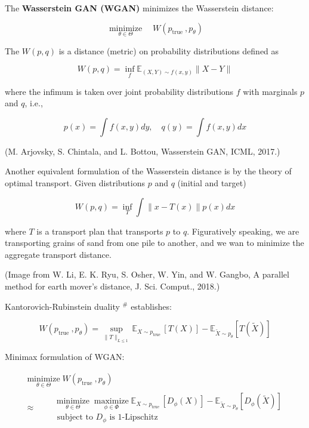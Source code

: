 \begin{definition}[21.29][WGAN]
    The \textbf{Wasserstein GAN (WGAN)} minimizes the Wasserstein distance:

    $$
    \underset{\theta \in \Theta}{\operatorname{minimize}} \quad W\left(p_{\text {true }}, p_{\theta}\right)
    $$

    The $W(p, q)$ is a distance (metric) on probability distributions defined as

    $$
    W(p, q)=\inf _{f} \mathbb{E}_{(X, Y) \sim f(x, y)}\|X-Y\|
    $$

    where the infimum is taken over joint probability distributions $f$ with marginals $p$ and $q$, i.e.,

    $$
    p(x)=\int f(x, y) d y, \quad q(y)=\int f(x, y) d x
    $$

    (M. Arjovsky, S. Chintala, and L. Bottou, Wasserstein GAN, ICML, 2017.)

    \par\noindent\textcolor{gray}{\hdashrule{\textwidth}{0.4pt}{1pt 2pt}}

    Another equivalent formulation of the Wasserstein distance is by the theory of optimal transport. Given distributions $p$ and $q$ (initial and target)

    $$
    W(p, q)=\inf _{T} \int\|x-T(x)\| p(x) d x
    $$

    where $T$ is a transport plan that transports $p$ to $q$.
    Figuratively speaking, we are transporting grains of sand from one pile to another, and we wan to minimize the aggregate transport distance.

    (Image from W. Li, E. K. Ryu, S. Osher, W. Yin, and W. Gangbo, A parallel method for earth mover’s distance, J. Sci. Comput., 2018.)

    \par\noindent\textcolor{gray}{\hdashrule{\textwidth}{0.4pt}{1pt 2pt}}

    Kantorovich-Rubinstein duality $^{\#}$ establishes:

    $$
    W\left(p_{\text {true }}, p_{\theta}\right)=\sup _{\|T\|_{L \leq 1}} \mathbb{E}_{X \sim p_{\text {true }}}[T(X)]-\mathbb{E}_{\tilde{X} \sim p_{\theta}}[T(\tilde{X})]
    $$

    Minimax formulation of WGAN:

    $$
    \begin{gathered}
    \underset{\theta \in \Theta}{\operatorname{minimize}} W\left(p_{\text {true }}, p_{\theta}\right) \\
    \approx \quad \begin{aligned}
    & \underset{\theta \in \Theta}{\operatorname{minimize}} \underset{\phi \in \Phi}{\operatorname{maximize}} \mathbb{E}_{X \sim p_{\text {true }}}[D_{\phi}(X)]-\mathbb{E}_{\tilde{X} \sim p_{\theta}}[D_{\phi}(\tilde{X})] \\
    & \text { subject to } D_{\phi} \text{ is } 1 \text{-Lipschitz}
    \end{aligned}
    \end{gathered}
    $$


\end{definition}
